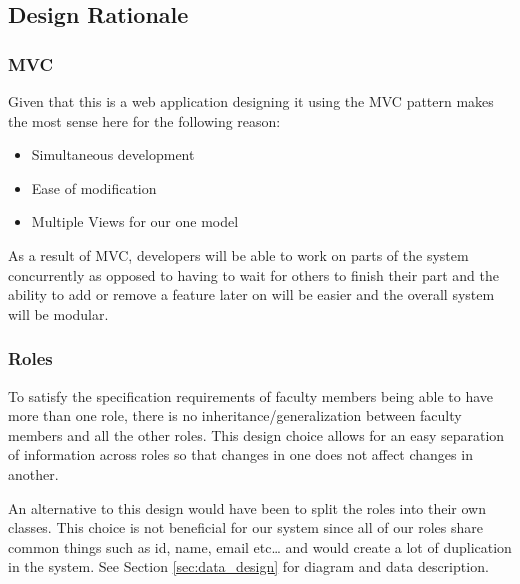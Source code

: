 \documentclass[fontsize=12pt,paper=letter,twoside]{scrartcl}
\begin{document}
\subsection{Design Rationale}

\subsubsection{MVC}

Given that this is a web application designing it using the MVC pattern makes the most sense here for the following reason:

\begin{itemize}
\item Simultaneous development
\item Ease of modification
\item Multiple Views for our one model
\end{itemize}

As a result of MVC, developers will be able to work on parts of the system concurrently as opposed to having to wait for others to finish their part and the ability to add or remove a feature later on will be easier and the overall system will be modular.

\subsubsection{Roles}

To satisfy the specification requirements of faculty members being able to have more than one role, there is no inheritance/generalization between  faculty members and all the other roles. This design choice allows for an easy separation of information across roles so that changes in one does not affect changes in another.

An alternative to this design would have been to split the roles into their own classes. This choice is not beneficial for our system since all of our roles share common things such as id, name, email etc… and would create a lot of duplication in the system. See Section \ref{sec:data_design} for diagram and data description.

\end{document}
